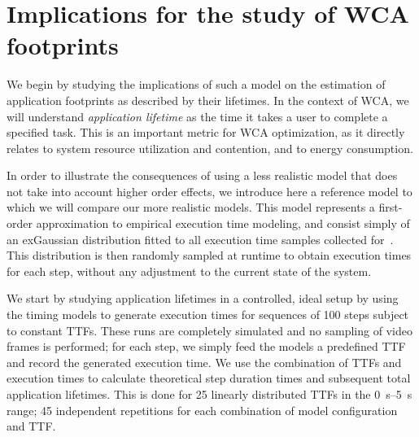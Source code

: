 \section{Implications for the study of \ac{WCA} footprints}\label{sec:implications:footprint}


We begin by studying the implications of such a model on the estimation of application footprints as described by their lifetimes.
In the context of \ac{WCA}, we will understand \emph{application lifetime} as the time it takes a user to complete a specified task.
This is an important metric for \ac{WCA} optimization, as it directly relates to system resource utilization and contention, and to energy consumption.

In order to illustrate the consequences of using a less realistic model that does not take into account higher order effects, we introduce here a reference model to which we will compare our more realistic models.
This model represents a first-order approximation to empirical execution time modeling, and consist simply of an \ac{exGaussian} distribution fitted to all execution time samples collected for~\cite{olguinmunoz:impact2021}.
This distribution is then randomly sampled at runtime to obtain execution times for each step, without any adjustment to the current state of the system.

We start by studying application lifetimes in a controlled, ideal setup by using the timing models to generate execution times for sequences of \num{100} steps subject to constant \acp{TTF}.
These runs are completely simulated and no sampling of video frames is performed; for each step, we simply feed the models a predefined \ac{TTF} and record the generated execution time.
We use the combination of \acp{TTF} and execution times to calculate theoretical step duration times and subsequent total application lifetimes.
This is done for \num{25} linearly distributed \acp{TTF} in the \SIrange[]{0}{5}{\second} range; \num{45} independent repetitions for each combination of model configuration and \ac{TTF}.

